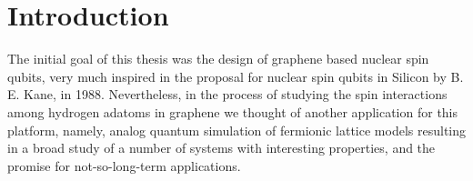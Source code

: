 \chapter{Introduction}
\label{ch:introduction}


The initial goal of this thesis was the design of graphene based nuclear spin qubits, very much inspired in the proposal for nuclear spin qubits in Silicon by B. E. Kane\cite{Kane1988}, in 1988. Nevertheless, in the process of studying the spin interactions among hydrogen adatoms in graphene we thought of another application for this platform, namely, analog quantum simulation of fermionic lattice models resulting in a broad study of a number of systems with interesting properties, and the promise for not-so-long-term applications.
\medskip


